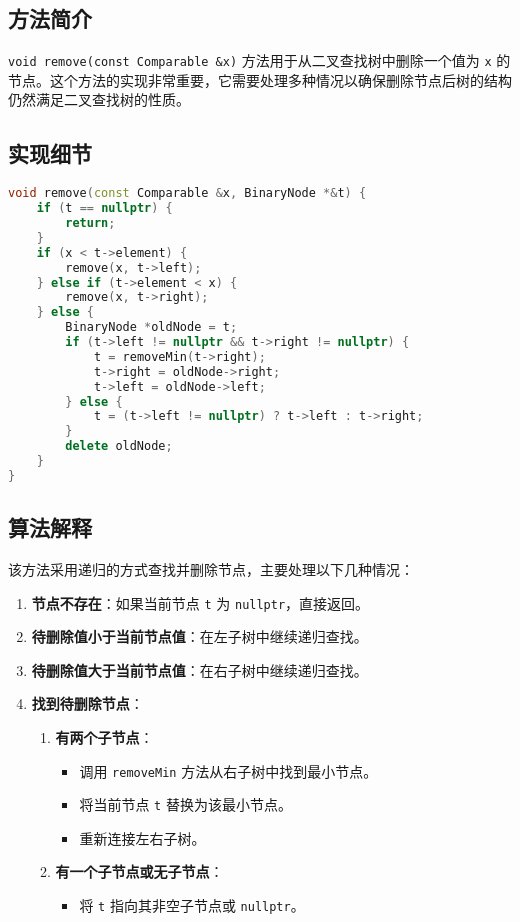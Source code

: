 \documentclass[UTF8]{ctexart}
\begin{document}
\subsection{方法简介}

\verb|void remove(const Comparable &x)| 方法用于从二叉查找树中删除一个值为 \verb|x| 的节点。这个方法的实现非常重要，它需要处理多种情况以确保删除节点后树的结构仍然满足二叉查找树的性质。

\subsection{实现细节}

\begin{lstlisting}[language=C++, caption=remove 方法的实现]
void remove(const Comparable &x, BinaryNode *&t) {
    if (t == nullptr) {
        return;
    }
    if (x < t->element) {
        remove(x, t->left);
    } else if (t->element < x) {
        remove(x, t->right);
    } else {
        BinaryNode *oldNode = t;
        if (t->left != nullptr && t->right != nullptr) {
            t = removeMin(t->right);
            t->right = oldNode->right;
            t->left = oldNode->left;
        } else {
            t = (t->left != nullptr) ? t->left : t->right;
        }
        delete oldNode;
    }
}
\end{lstlisting}

\subsection{算法解释} 

该方法采用递归的方式查找并删除节点，主要处理以下几种情况： 

\begin{enumerate}
    \item \textbf{节点不存在}：如果当前节点 \verb|t| 为 \verb|nullptr|，直接返回。
    \item \textbf{待删除值小于当前节点值}：在左子树中继续递归查找。
    \item \textbf{待删除值大于当前节点值}：在右子树中继续递归查找。
    \item \textbf{找到待删除节点}：
    \begin{enumerate}
        \item \textbf{有两个子节点}：
        \begin{itemize}
            \item 调用 \verb|removeMin| 方法从右子树中找到最小节点。
            \item 将当前节点 \verb|t| 替换为该最小节点。
            \item 重新连接左右子树。
        \end{itemize}
        \item \textbf{有一个子节点或无子节点}：
        \begin{itemize}
            \item 将 \verb|t| 指向其非空子节点或 \verb|nullptr|。
        \end{itemize}
    \end{enumerate}
\end{enumerate}
\end{document}
